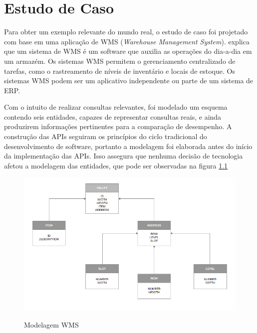\chapter[Estudo de Caso]{Estudo de Caso}

Para obter um exemplo relevante do mundo real, o estudo de caso foi projetado com base em uma aplicação de WMS (\textit{Warehouse Management System}).  explica que um sistema de WMS é um software que auxilia as operações do dia-a-dia em um armazém. Os sistemas WMS permitem o gerenciamento centralizado de tarefas, como o rastreamento de níveis de inventário e locais de estoque. Os sistemas WMS podem ser  um aplicativo independente ou parte de um sistema de ERP.

Com o intuito de realizar consultas relevantes, foi modelado um esquema contendo seis entidades, capazes de representar consultas reais, e ainda produzirem informações pertinentes para a comparação de desempenho. A construção das APIs seguiram os princípios do ciclo tradicional do desenvolvimento de software, portanto a modelagem foi elaborada antes do início da implementação das APIs. Isso assegura que nenhuma decisão de tecnologia afetou a modelagem das entidades, que pode ser observadas na figura \ref{fig:my-model}

\begin{figure}[htbp]
\centering
\includegraphics[width=1\textwidth]{figuras/model.png}
\label{fig:my-model}
\caption{Modelagem WMS}
\author{fonte: Autor}
\end{figure}

